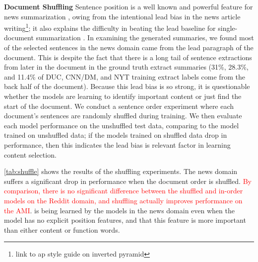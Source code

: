 \textbf{Document Shuffling} Sentence position is a well known and 
powerful feature for news summarization \cite{hong2014improving}, owing 
from the intentional lead bias in the news article writing\footnote{link to ap style guide on inverted pyramid}; it also explains the difficulty in beating
the lead baseline for single-document summarization 
\cite{nenkova2005automatic,rau:1999}.
In examining the generated summaries, we found
most of the selected sentences in the news domain came from the lead paragraph
of the document. This is despite the fact that there is a long tail of 
sentence extractions from later in the document in the ground truth extract 
summaries (31\%, 28.3\%, and 11.4\% of DUC, CNN/DM, and NYT training extract labels come 
from the back half of the document). 
Because this lead bias is so strong, it is questionable whether
the models are learning to identify important content or just find the start
of the document. We conduct a sentence order experiment where 
each document's sentences are randomly shuffled during training. We then
evaluate each model performance on the unshuffled test data, comparing to 
the model trained on unshuffled data; if the models trained on shuffled data
drop in performance, then this indicates the lead bias is relevant factor
in learning content selection.

\autoref{tab:shuffle} shows the results
of the shuffling experiments. 
The news domain suffers a significant drop in performance 
when the document order is shuffled. \textcolor{red}{By comparison, there is no significant difference between the shuffled and in-order models on 
the Reddit domain, and shuffling actually improves performance on the AMI}.
is being learned by the models in the news domain even when the model 
has no explicit position features, and that this feature is more important 
than either content or function words.







